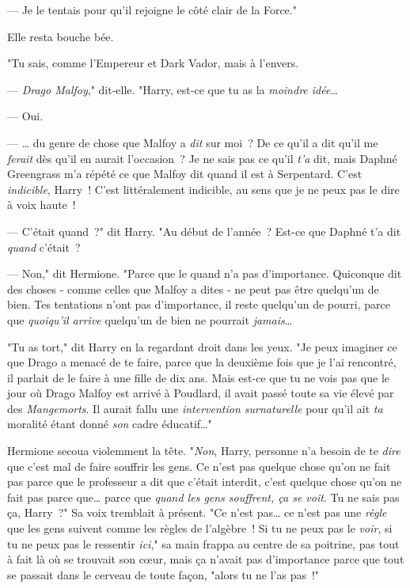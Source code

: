 --- Je le tentais pour qu'il rejoigne le côté clair de la Force."

Elle resta bouche bée.

"Tu sais, comme l'Empereur et Dark Vador, mais à l'envers.

--- \emph{Drago Malfoy}," dit-elle. "Harry, est-ce que tu as la \emph{moindre idée}…

--- Oui.

--- … du genre de chose que Malfoy a \emph{dit} sur moi~? De ce qu'il a dit qu'il me \emph{ferait} dès qu'il en aurait l'occasion~? Je ne sais pas ce qu'il \emph{t'a} dit, mais Daphné Greengrass m'a répété ce que Malfoy dit quand il est à Serpentard. C'est \emph{indicible}, Harry~! C'est littéralement indicible, au sens que je ne peux pas le dire à voix haute~!

--- C'était quand~?" dit Harry. "Au début de l'année~? Est-ce que Daphné t'a dit \emph{quand} c'était~?

--- Non," dit Hermione. "Parce que le quand n'a pas d'importance. Quiconque dit des choses - comme celles que Malfoy a dites - ne peut pas être quelqu'un de bien. Tes tentations n'ont pas d'importance, il reste quelqu'un de pourri, parce que \emph{quoiqu'il arrive} quelqu'un de bien ne pourrait \emph{jamais}…

"Tu as tort," dit Harry en la regardant droit dans les yeux. "Je peux imaginer ce que Drago a menacé de te faire, parce que la deuxième fois que je l'ai rencontré, il parlait de le faire à une fille de dix ans. Mais est-ce que tu ne vois pas que le jour où Drago Malfoy est arrivé à Poudlard, il avait passé toute sa vie élevé par des \emph{Mangemorts}. Il aurait fallu une \emph{intervention surnaturelle} pour qu'il ait \emph{ta} moralité étant donné \emph{son} cadre éducatif…"

Hermione secoua violemment la tête. "\emph{Non}, Harry, personne n'a besoin de te \emph{dire} que c'est mal de faire souffrir les gens. Ce n'est pas quelque chose qu'on ne fait pas parce que le professeur a dit que c'était interdit, c'est quelque chose qu'on ne fait pas parce que… parce que \emph{quand les gens souffrent, ça se voit}. Tu ne sais pas ça, Harry~?" Sa voix tremblait à présent. "Ce n'est pas… ce n'est pas une \emph{règle} que les gens suivent comme les règles de l'algèbre~! Si tu ne peux pas le \emph{voir}, si tu ne peux pas le ressentir \emph{ici}," sa main frappa au centre de sa poitrine, pas tout à fait là où se trouvait son cœur, mais ça n'avait pas d'importance parce que tout se passait dans le cerveau de toute façon, "alors tu ne l'as pas~!"

